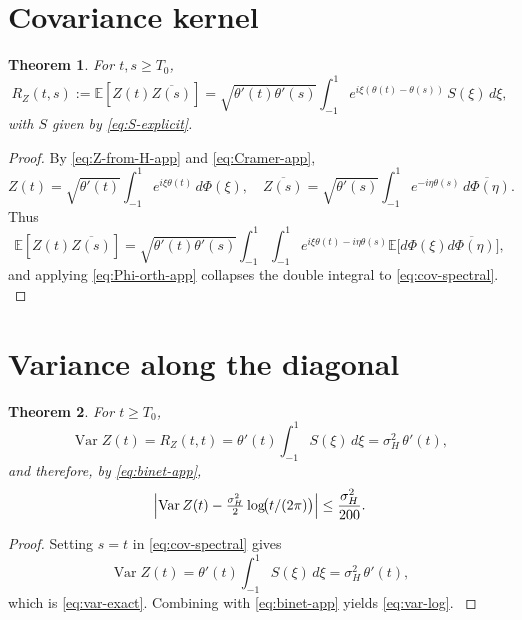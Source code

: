 \documentclass[11pt]{article}
\newtheorem{theorem}{Theorem}[section]
\begin{document}
\section{Covariance kernel}

\begin{theorem}
\label{thm:cov-Z}
For $t,s\ge T_{0}$,
\begin{equation}
R_{Z}(t,s)
:=
\mathbb{E}[Z(t)\overline{Z(s)}]
=
\sqrt{\theta'(t)\theta'(s)}
\int_{-1}^{1} e^{i\xi(\theta(t)-\theta(s))}\,S(\xi)\,d\xi,
\label{eq:cov-spectral}
\end{equation}
with $S$ given by \eqref{eq:S-explicit}.
\end{theorem}

\begin{proof}
By \eqref{eq:Z-from-H-app} and \eqref{eq:Cramer-app},
\[
Z(t)
=
\sqrt{\theta'(t)}\int_{-1}^{1} e^{i\xi\theta(t)}\,d\Phi(\xi),
\quad
\overline{Z(s)}
=
\sqrt{\theta'(s)}\int_{-1}^{1} e^{-i\eta\theta(s)}\,\overline{d\Phi(\eta)}.
\]
Thus
\[
\mathbb{E}[Z(t)\overline{Z(s)}]
=
\sqrt{\theta'(t)\theta'(s)}
\int_{-1}^{1}\!\!\int_{-1}^{1}
e^{i\xi\theta(t)-i\eta\theta(s)}
\mathbb{E}\!\bigl[d\Phi(\xi)\overline{d\Phi(\eta)}\bigr],
\]
and applying \eqref{eq:Phi-orth-app} collapses the double integral to
\eqref{eq:cov-spectral}. \cite{SpectralNonNegativity}
\end{proof}

\section{Variance along the diagonal}

\begin{theorem}
\label{thm:var-Z}
For $t\ge T_{0}$,
\begin{equation}
\operatorname{Var} Z(t)
=
R_{Z}(t,t)
=
\theta'(t)\int_{-1}^{1} S(\xi)\,d\xi
=
\sigma_{H}^{2}\,\theta'(t),
\label{eq:var-exact}
\end{equation}
and therefore, by \eqref{eq:binet-app},
\begin{equation}
\Bigl|\operatorname{Var} Z(t)
-\tfrac{\sigma_{H}^{2}}{2}\log\!\bigl(t/(2\pi)\bigr)\Bigr|
\le
\frac{\sigma_{H}^{2}}{200}.
\label{eq:var-log}
\end{equation}
\end{theorem}

\begin{proof}
Setting $s=t$ in \eqref{eq:cov-spectral} gives
\[
\operatorname{Var} Z(t)
=
\theta'(t)\int_{-1}^{1} S(\xi)\,d\xi
=
\sigma_{H}^{2}\,\theta'(t),
\]
which is \eqref{eq:var-exact}. Combining with \eqref{eq:binet-app} yields
\eqref{eq:var-log}. \cite{StationaryPhase,SpectralNonNegativity}
\end{proof}
\end{document}
